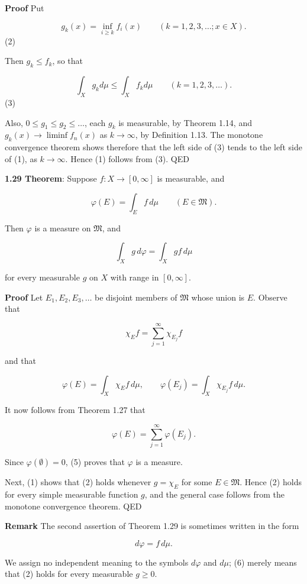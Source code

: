 \documentclass[11pt]{article}
\begin{document}
\textbf{\textbf{Proof}} Put

\[
g_{k}(x) = \inf_{i \geq k} f_{i}(x) \qquad (k = 1, 2, 3, \ldots; x \in X).
\](2)

Then \(g_{k} \leq f_{k}\), so that

\[
\int_{X} g_{k} d\mu \leq \int_{X} f_{k} d\mu \qquad (k = 1, 2, 3, \ldots).
\](3)

Also, \(0 \leq g_{1} \leq g_{2} \leq \dots\), each \(g_{k}\) is measurable, by Theorem 1.14, and \(g_{k}(x) \to \liminf f_{n}(x)\) as \(k \to \infty\), by Definition 1.13. The monotone convergence theorem shows therefore that the left side of (3) tends to the left side of (1), as \(k \to \infty\). Hence (1) follows from (3). QED

\label{orga2b530e}
\textbf{\textbf{1.29 Theorem}}: Suppose \(f \colon X \to [0, \infty]\) is measurable, and

\[
\varphi(E) = \int_{E} f \, d\mu \qquad (E \in \mathfrak{M}).\tag{1}
\]

Then \(\varphi\) is a measure on \(\mathfrak{M}\), and

\[
\int_{X} g \, d\varphi = \int_{X} g f \, d\mu\tag{2}
\]


for every measurable \(g\) on \(X\) with range in \([0, \infty]\).

\textbf{\textbf{Proof}} Let \(E_{1}, E_{2}, E_{3}, \ldots\) be disjoint members of \(\mathfrak{M}\) whose union is \(E\). Observe that

\[
\chi_{E} f = \sum_{j=1}^{\infty} \chi_{E_{j}} f\tag{3}
\]

and that

\[
\varphi(E) = \int_{X} \chi_{E} f \, d\mu, \qquad \varphi(E_{j}) = \int_{X} \chi_{E_{j}} f \, d\mu.\tag{4}
\]


It now follows from Theorem 1.27 that

\[
\varphi(E) = \sum_{j=1}^{\infty} \varphi(E_{j}).\tag{5}
\]

Since \(\varphi(\emptyset) = 0\), (5) proves that \(\varphi\) is a measure.

Next, (1) shows that (2) holds whenever \(g = \chi_{E}\) for some \(E \in \mathfrak{M}\). Hence (2) holds for every simple measurable function \(g\), and the general case follows from the monotone convergence theorem. QED

\textbf{\textbf{Remark}} The second assertion of Theorem 1.29 is sometimes written in the form

\[
d\varphi = f \, d\mu.\tag{6}
\]

We assign no independent meaning to the symbols \(d\varphi\) and \(d\mu\); (6) merely means that (2) holds for every measurable \(g \geq 0\).
\end{document}
